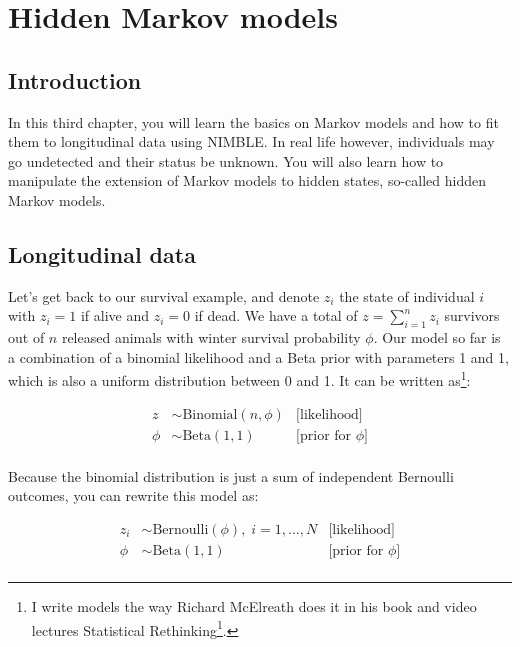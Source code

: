 \documentclass[
  12pt,
]{krantz}
\renewcommand{\href}[2]{#2\footnote{\url{#1}}}
\begin{document}
\hypertarget{hmmcapturerecapture}{%
\chapter{Hidden Markov models}\label{hmmcapturerecapture}}

\hypertarget{introduction-3}{%
\section{Introduction}\label{introduction-3}}

In this third chapter, you will learn the basics on Markov models and how to fit them to longitudinal data using NIMBLE. In real life however, individuals may go undetected and their status be unknown. You will also learn how to manipulate the extension of Markov models to hidden states, so-called hidden Markov models.

\hypertarget{longitudinal-data}{%
\section{Longitudinal data}\label{longitudinal-data}}

Let's get back to our survival example, and denote \(z_i\) the state of individual \(i\) with \(z_i = 1\) if alive and \(z_i = 0\) if dead. We have a total of \(z = \displaystyle{\sum_{i=1}^{n}{z_i}}\) survivors out of \(n\) released animals with winter survival probability \(\phi\). Our model so far is a combination of a binomial likelihood and a Beta prior with parameters 1 and 1, which is also a uniform distribution between 0 and 1. It can be written as\footnote{I write models the way Richard McElreath does it in his book and video lectures \href{https://xcelab.net/rm/statistical-rethinking/}{Statistical Rethinking}.}:

\begin{align*}
   z &\sim \text{Binomial}(n, \phi) &\text{[likelihood]}
   \\
  \phi &\sim \text{Beta}(1, 1) &\text{[prior for }\phi \text{]} \\
\end{align*}

Because the binomial distribution is just a sum of independent Bernoulli outcomes, you can rewrite this model as:

\begin{align*}
   z_i &\sim \text{Bernoulli}(\phi), \; i = 1, \ldots, N &\text{[likelihood]}
   \\
  \phi &\sim \text{Beta}(1, 1) &\text{[prior for }\phi \text{]} \\
\end{align*}
\end{document}
